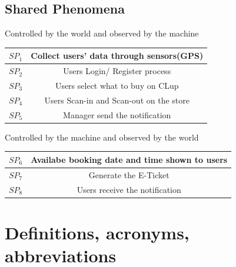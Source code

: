 \documentclass[a4paper,12pt]{report}
\begin{document}
\subsection{Shared Phenomena}
Controlled by the world and observed by the machine\\
\begin{center}
	\begin{tabular}{ c|c } 
		\hline
		$SP_1$ & Collect users' data through sensors(GPS) \\ 
		\hline
		$SP_2$ & Users Login/ Register process \\ 
		\hline
		$SP_3$ & Users select what to buy on CLup\\ 
		\hline
		$SP_4$ & Users Scan-in and Scan-out on the store\\ 
		\hline
		$SP_5$ & Manager send the notification\\ 
		\hline
	\end{tabular}
\end{center}
Controlled by the machine and observed by the world\\
\begin{center}
	\begin{tabular}{ c|c } 
		\hline
		$SP_6$ &  Availabe booking date and time shown to users\\ 
		\hline
		$SP_7$ &  Generate the E-Ticket\\ 
		\hline
		$SP_8$ &  Users receive the notification\\ 
		\hline
	\end{tabular}
\end{center}



\section{Definitions, acronyms, abbreviations}
\end{document}
